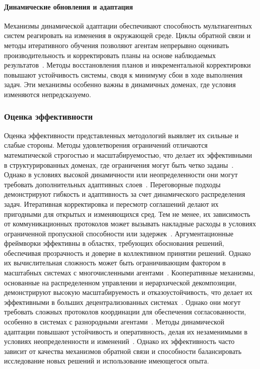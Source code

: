 \documentclass[%
]{ittmm}
\begin{document}
\paragraph{Динамические обновления и адаптация}

Механизмы динамической адаптации обеспечивают способность мультиагентных систем реагировать на изменения в окружающей среде.
Циклы обратной связи и методы итеративного обучения позволяют агентам непрерывно оценивать производительность
и корректировать планы на основе наблюдаемых результатов~\cite{LU2014215}.
Методы восстановления планов и инкрементальной корректировки повышают устойчивость системы,
сводя к минимуму сбои в ходе выполнения задач.
Эти механизмы особенно важны в динамичных доменах, где условия изменяются непредсказуемо.

\subsubsection{Оценка эффективности}

Оценка эффективности представленных методологий выявляет их сильные и слабые стороны.
Методы удовлетворения ограничений отличаются математической строгостью и масштабируемостью,
что делает их эффективными в структурированных доменах,
где ограничения могут быть четко заданы~\cite{STOLBA2017175}.
Однако в условиях высокой динамичности или неопределенности они могут требовать дополнительных адаптивных слоев~\cite{SHARON201540}.
Переговорные подходы демонстрируют гибкость и адаптивность за счет динамического распределения задач.
Итеративная корректировка и пересмотр соглашений делают их пригодными для открытых и изменяющихся сред.
Тем не менее, их зависимость от коммуникационных протоколов может вызывать накладные расходы в условиях ограниченной пропускной способности или задержек~\cite{PAJARESFERRANDO201322}.
Аргументационные фреймворки эффективны в областях, требующих обоснования решений,
обеспечивая прозрачность и доверие в коллективном принятии решений.
Однако их вычислительная сложность может быть ограничивающим фактором в масштабных системах с многочисленными агентами~\cite{FERRANDO20171}.
Кооперативные механизмы, основанные на распределенном управлении и иерархической декомпозиции,
демонстрируют высокую масштабируемость и отказоустойчивость,
что делает их эффективными в больших децентрализованных системах~\cite{MA2021103823}.
Однако они могут требовать сложных протоколов координации для обеспечения согласованности, особенно в системах с разнородными агентами~\cite{JUNG1999149}.
Методы динамической адаптации повышают устойчивость и оперативность,
делая их незаменимыми в условиях неопределенности и изменений~\cite{LU2014215}.
Однако их эффективность часто зависит от качества механизмов обратной связи
и способности балансировать исследование новых решений и использование имеющегося опыта.
\end{document}

